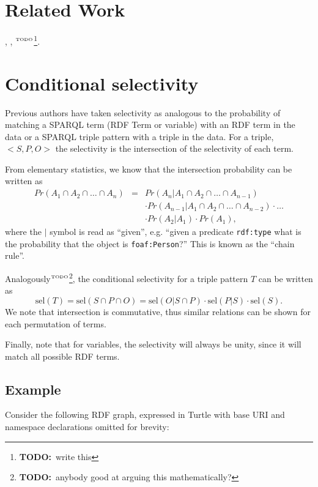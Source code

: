 \documentclass[12pt, draft]{article}
\newcommand{\rdfterm}[1]{\texttt{#1}}
\newcommand{\todo}[1]{\ensuremath{^{\textrm{\tiny{TODO}\normalsize}}}\footnote{\textbf{TODO:}~#1}}
\newcommand{\sel}[1]{\ensuremath{\mathrm{sel}\left(#1\right)}}
\begin{document}
\section{Related Work}

\cite{splendid}, \cite{wodqa}, \cite{Lv:2009:SEC:1685170.1685590} \todo{write this}.

\section{Conditional selectivity}\label{sec:cond}

Previous authors have taken selectivity as analogous to the
probability of matching a SPARQL term (RDF Term or variable) with an
RDF term in the data or a SPARQL triple pattern with a triple in the
data.  For a triple, $<S, P, O>$ the selectivity is the intersection
of the selectivity of each term.

From elementary statistics, we know that the intersection probability
can be written as
\begin{eqnarray}
Pr(A_1 \cap A_2  \cap \ldots \cap A_n) &=& 
  Pr(A_n | A_1 \cap A_2  \cap \ldots \cap A_{n-1}) \nonumber\\
  &&\cdot Pr(A_{n-1} | A_1 \cap A_2  \cap \ldots \cap A_{n-2}) \cdot \ldots \nonumber\\
  && \cdot Pr(A_2 | A_1) \cdot Pr(A_1) ,
\end{eqnarray}
where the $|$ symbol is read as ``given'', e.g. ``given a predicate
\rdfterm{rdf:type} what is the probability that the object is
\rdfterm{foaf:Person}?'' This is known as the ``chain rule''.

Analogously\todo{anybody good at arguing this mathematically?}, the
conditional selectivity for a triple pattern $T$ can be written as 
\begin{equation}\label{eq:sel}
\sel{T} = \sel{S \cap P \cap O} = \sel{O | S \cap P} \cdot \sel{P | S}
\cdot \sel{S} . 
\end{equation}
We note that intersection is commutative, thus similar
relations can be shown for each permutation of terms.

Finally, note that for variables, the selectivity will always be
unity, since it will match all possible RDF terms.

\subsection{Example}\label{sec:example}

Consider the following RDF graph, expressed in Turtle with base URI
and namespace declarations omitted for brevity:
\end{document}
